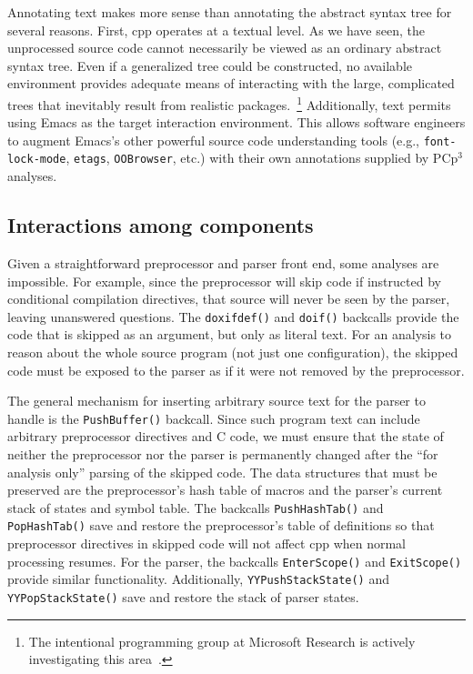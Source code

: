 \documentclass{article}
\newcommand{\pcp}{\mbox{\textsf{PCp}$^3$}}
\newcommand{\Cpp}{\mbox{\textsf{cpp}}}
\newcommand{\C}{\mbox{\textsf{C}}}
\newcommand{\eg}{e.g.,}
\newcommand{\etc}{etc}  %
\begin{document}
Annotating text makes more sense than annotating the abstract syntax
tree for several reasons.  First, \Cpp{} operates at a textual level.
As we have seen, the unprocessed source code cannot necessarily be
viewed as an ordinary abstract syntax tree.  Even if a generalized tree
could be constructed, no available environment provides adequate means
of interacting with the large, complicated trees that inevitably result
from realistic packages.~\footnote{The intentional programming group at
  Microsoft Research is actively investigating this
  area~\cite{MSIPPersonal}.}  Additionally, text permits using Emacs as the
target interaction environment. This allows software engineers to
augment Emacs's other powerful source code understanding tools (\eg{}
\texttt{font-lock-mode}, \texttt{etags}, \texttt{OOBrowser}, \etc{}.)
with their own annotations supplied by \pcp{} analyses.


\subsection{Interactions among components}

Given a straightforward preprocessor and parser front end, some analyses
are impossible.  For example, since the preprocessor will skip code if
instructed by conditional compilation directives, that source will never
be seen by the parser, leaving unanswered questions.  The
\texttt{doxifdef()} and \texttt{doif()} backcalls provide the code that is
skipped as an argument, but only as literal text.  For an analysis to
reason about the whole source program (not just one configuration), the
skipped code must be exposed to the parser as if it were not removed by
the preprocessor.

The general mechanism for inserting arbitrary source text for the parser
to handle is the \texttt{PushBuffer()} backcall.  Since such program text
can include arbitrary preprocessor directives and \C{} code, we must
ensure that the state of neither the preprocessor nor the parser is
permanently changed after the ``for analysis only'' parsing of the
skipped code.  The data structures that must be preserved are the
preprocessor's hash table of macros and the parser's current stack of
states and symbol table.  The backcalls \texttt{PushHashTab()} and
\texttt{PopHashTab()} save and restore the preprocessor's table of
definitions so that preprocessor directives in skipped code will not
affect \Cpp{} when normal processing resumes.  For the parser, the
backcalls \texttt{EnterScope()} and \texttt{ExitScope()} provide similar
functionality.  Additionally, \texttt{YYPushStackState()} and
\texttt{YYPopStackState()} save and restore the stack of parser states.
\end{document}
